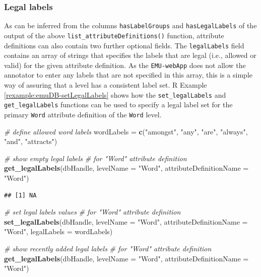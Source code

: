 \documentclass[]{book}
\newenvironment{Shaded}{\begin{snugshade}}{\end{snugshade}}
\newcommand{\CommentTok}[1]{\textcolor[rgb]{0.56,0.35,0.01}{\textit{#1}}}
\newcommand{\DataTypeTok}[1]{\textcolor[rgb]{0.13,0.29,0.53}{#1}}
\newcommand{\KeywordTok}[1]{\textcolor[rgb]{0.13,0.29,0.53}{\textbf{#1}}}
\newcommand{\NormalTok}[1]{#1}
\newcommand{\StringTok}[1]{\textcolor[rgb]{0.31,0.60,0.02}{#1}}
\theoremstyle{definition}
\theoremstyle{definition}
\theoremstyle{definition}
\theoremstyle{remark}
\begin{document}
\hypertarget{subsubsec:emuDBlegalLabels}{%
\subsubsection{Legal labels}\label{subsubsec:emuDBlegalLabels}}

As can be inferred from the columns \texttt{hasLabelGroups} and
\texttt{hasLegalLabels} of the output of the above
\texttt{list\_attributeDefinitions()} function, attribute definitions
can also contain two further optional fields. The \texttt{legalLabels}
field contains an array of strings that specifies the labels that are
legal (i.e., allowed or valid) for the given attribute definition. As
the \texttt{EMU-webApp} does not allow the annotator to enter any labels
that are not specified in this array, this is a simple way of assuring
that a level has a consistent label set. R Example
\ref{rexample:emuDB-setLegalLabels} shows how the
\texttt{set\_legalLabels} and \texttt{get\_legalLabels} functions can be
used to specify a legal label set for the primary \texttt{Word}
attribute definition of the \texttt{Word} level.

\begin{Shaded}
\begin{Highlighting}[]
\CommentTok{# define allowed word labels}
\NormalTok{wordLabels =}\StringTok{ }\KeywordTok{c}\NormalTok{(}\StringTok{"amongst"}\NormalTok{, }\StringTok{"any"}\NormalTok{, }\StringTok{"are"}\NormalTok{,}
               \StringTok{"always"}\NormalTok{, }\StringTok{"and"}\NormalTok{, }\StringTok{"attracts"}\NormalTok{)}

\CommentTok{# show empty legal labels}
\CommentTok{# for "Word" attribute definition}
\KeywordTok{get_legalLabels}\NormalTok{(dbHandle,}
                \DataTypeTok{levelName =} \StringTok{"Word"}\NormalTok{,}
                \DataTypeTok{attributeDefinitionName =} \StringTok{"Word"}\NormalTok{)}
\end{Highlighting}
\end{Shaded}

\begin{verbatim}
## [1] NA
\end{verbatim}

\begin{Shaded}
\begin{Highlighting}[]
\CommentTok{# set legal labels values}
\CommentTok{# for "Word" attribute definition}
\KeywordTok{set_legalLabels}\NormalTok{(dbHandle,}
                \DataTypeTok{levelName =} \StringTok{"Word"}\NormalTok{,}
                \DataTypeTok{attributeDefinitionName =} \StringTok{"Word"}\NormalTok{,}
                \DataTypeTok{legalLabels =}\NormalTok{ wordLabels)}

\CommentTok{# show recently added legal labels}
\CommentTok{# for "Word" attribute definition}
\KeywordTok{get_legalLabels}\NormalTok{(dbHandle,}
                \DataTypeTok{levelName =} \StringTok{"Word"}\NormalTok{,}
                \DataTypeTok{attributeDefinitionName =} \StringTok{"Word"}\NormalTok{)}
\end{Highlighting}
\end{Shaded}
\end{document}
